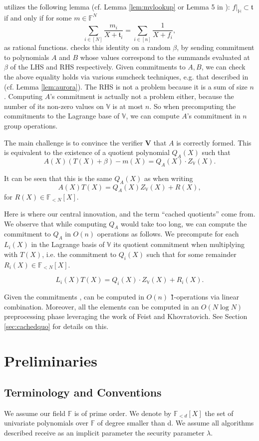 \documentclass[11pt]{article} %
\newcommand{\F}{\ensuremath{\mathbb F}\xspace}
\newcommand{\ver}{\ensuremath{\mathsf{\mathbf{V}}}\xspace}
\newcommand{\polysofdeg}[1]{\ensuremath{\F_{< #1}[X]}\xspace}
\newcommand{\sumi}[1]{\sum_{i\in[#1]}}
\newcommand{\restricttoset}[2]{\ensuremath{#1|_{#2}}\xspace}
\newcommand{\subspace}{\ensuremath{\mathbb{H}}\xspace}
\newcommand{\bigspace}{\ensuremath{\mathbb{V}}\xspace}
\newcommand{\witsize}{\ensuremath{n}\xspace}
\newcommand{\tabsize}{\ensuremath{N}\xspace}
\newcommand{\tabruntime}{\ensuremath{\tabsize\log\tabsize}\xspace}
\newcommand{\tab}{\ensuremath{\mathfrak{t}}\xspace}
\begin{document}
\cite{mvlookup} utilizes the following lemma (cf. Lemma \ref{lem:mvlookup} or Lemma 5 in \cite{mvlookup}):
$\restricttoset{f}{\subspace}\subset \tab$ if and only if for some $m\in \F^\tabsize$
 \[\sumi{\tabsize}\frac{m_i}{X+\tab_i}=\sumi{\witsize}\frac{1}{X+f_i},\]
 as rational functions.
\cite{mvlookup} checks this identity on a random $\beta$,
by sending commitment to polynomials $A$ and $B$ whose values correspond to the summands evaluated at $\beta$ of the LHS and RHS
respectively.
Given commitments to $A,B$, we can check the above equality holds via various sumcheck techniques, e.g. that described in \cite{aurora} (cf. Lemma \ref{lem:aurora}).
The RHS is not a problem because it is a sum of size \witsize.
Computing $A$'s commitment is actually not a problem either, because the number of its non-zero values on \bigspace
is at most \witsize. So when precomputing the commitments to the Lagrange base of  \bigspace, we can compute $A$'s commitment in  \witsize group operations.

The main challenge is to convince the verifier \ver that $A$ is correctly formed.
This is equivalent to the existence of a quotient polynomial $Q_A(X)$ such that
\[A(X)(T(X)+\beta)-m(X)= Q_A(X)\cdot Z_\bigspace(X).\]

It can be seen that this is the same $Q_A(X)$ as when writing
\[A(X)T(X)=Q_A(X)Z_\bigspace(X) +R(X),\]
for $R(X)\in\polysofdeg{\tabsize}$.

Here is where our central innovation, and the term ``cached quotients'' come from. We observe that while computing 
$Q_A$ would take too long, we can compute the commitment  to $Q_A$ in $O(\witsize)$ operations as follows.
We precompute for each $L_i(X)$ in the Lagrange basis of \bigspace its quotient commitment when multiplying with $T(X)$, i.e.
the commitment to $Q_i(X)$ such that for some remainder $R_i(X)\in \polysofdeg{\tabsize}$.

\[L_i(X)T(X)= Q_i(X)\cdot Z_\bigspace(X) + R_i(X).\]

Given the commitments ,  can be computed in $O(\witsize)$ \G1-operations via linear combination.
Moreover, all the elements  can be computed in an $O(\tabruntime)$ preprocessing phase leveraging the work of Feist and Khovratovich\cite{fastkzgproofsorig}. See Section \ref{sec:cachedquo} for details on this.
\section{Preliminaries}
\subsection{Terminology and Conventions}\label{sec:terminology}
We assume our field \F is of prime order.
We denote by \polysofdeg{d} the set of univariate polynomials over \F of degree smaller than d. 
We assume all algorithms described receive as an implicit parameter the security parameter $\lambda$.
\end{document}
